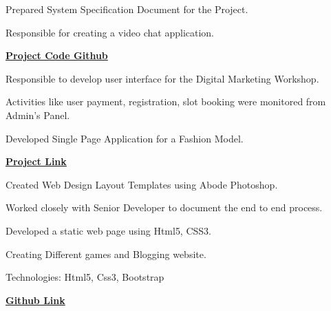 \documentclass[]{deedy-resume-openfont}
\begin{document}
\begin{minipage}[t]{0.66\textwidth}
\vspace{\topsep} %
\begin{tightemize}
\item Prepared System Specification Document for the Project.
\item Responsible for creating a video chat application.
\item \href{https://github.com/karshil2309/Webrtc_Android_login}{\bf Project Code Github}
\end{tightemize}
\sectionsep

\begin{tightemize}
\item Responsible to develop user interface for the Digital Marketing Workshop.
\item Activities like user payment, registration, slot booking were monitored from Admin's Panel.
\item Developed Single Page Application for a Fashion Model.
\item \href{https://karshil2309.github.io/Website_Workshop/}{\bf Project Link}

\end{tightemize}
\sectionsep

\begin{tightemize}
\item Created Web Design Layout Templates using Abode Photoshop.
\item Worked closely with Senior Developer to document the end to end process.
\item Developed a static web page using Html5, CSS3.
\end{tightemize}
\sectionsep

\begin{tightemize}
\item Creating Different games and Blogging website.
\item Technologies: Html5, Css3, Bootstrap
\item \href{https://github.com/karshil2309/Practice_FrontEnd}{\bf Github Link}
\end{tightemize}
\sectionsep


\end{minipage}
\end{document}
